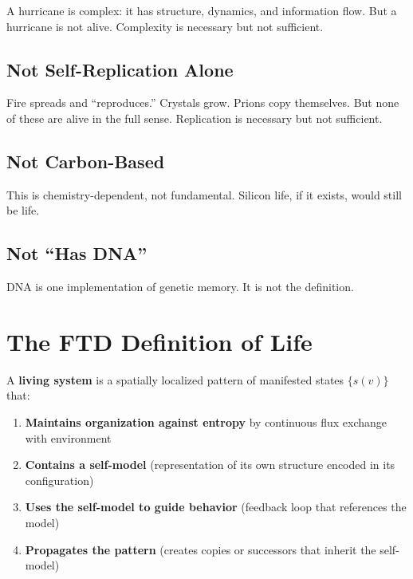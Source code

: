 \documentclass[
  11pt,
  letterpaper,
  twoside,
  openright]{book}
\providecommand{\tightlist}{%
  \setlength{\itemsep}{0pt}\setlength{\parskip}{0pt}}
\begin{document}
A hurricane is complex: it has structure, dynamics, and information
flow. But a hurricane is not alive. Complexity is necessary but not
sufficient.

\subsection{Not Self-Replication
Alone}\label{not-self-replication-alone}

Fire spreads and ``reproduces.'' Crystals grow. Prions copy themselves.
But none of these are alive in the full sense. Replication is necessary
but not sufficient.

\subsection{Not Carbon-Based}\label{not-carbon-based}

This is chemistry-dependent, not fundamental. Silicon life, if it
exists, would still be life.

\subsection{Not ``Has DNA''}\label{not-has-dna}

DNA is one implementation of genetic memory. It is not the definition.

\section{The FTD Definition of Life}\label{the-ftd-definition-of-life}

\begin{tcolorbox}[enhanced jigsaw, leftrule=.75mm, title=\textcolor{quarto-callout-important-color}{\faExclamation}\hspace{0.5em}{Definition: Life}, bottomrule=.15mm, opacityback=0, coltitle=black, arc=.35mm, colframe=quarto-callout-important-color-frame, colbacktitle=quarto-callout-important-color!10!white, colback=white, titlerule=0mm, breakable, bottomtitle=1mm, toptitle=1mm, rightrule=.15mm, toprule=.15mm, left=2mm, opacitybacktitle=0.6]

A \textbf{living system} is a spatially localized pattern of manifested
states \(\{s(v)\}\) that:

\begin{enumerate}
\def\labelenumi{\arabic{enumi}.}
\tightlist
\item
  \textbf{Maintains organization against entropy} by continuous flux
  exchange with environment
\item
  \textbf{Contains a self-model} (representation of its own structure
  encoded in its configuration)
\item
  \textbf{Uses the self-model to guide behavior} (feedback loop that
  references the model)
\item
  \textbf{Propagates the pattern} (creates copies or successors that
  inherit the self-model)
\end{enumerate}

\end{tcolorbox}
\end{document}
